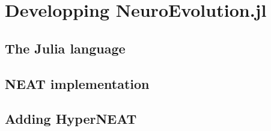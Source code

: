 \chapter{Developping NeuroEvolution.jl}
\label{sec:neuroevo}

\section{The Julia language}

\section{NEAT implementation}

\section{Adding HyperNEAT}

